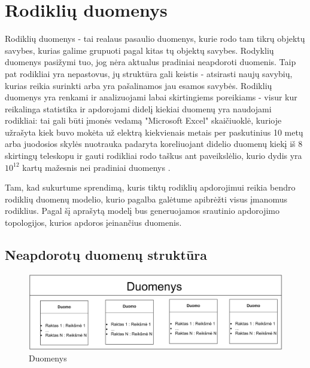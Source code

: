 \documentclass{VUMIFPSbakalaurinis}
\begin{document}
\section{Rodiklių duomenys}

Rodiklių duomenys - tai realaus pasaulio duomenys, kurie rodo tam tikrų objektų savybes, kurias galime grupuoti pagal kitas tų objektų savybes. Rodyklių duomenys pasižymi tuo, jog nėra aktualus pradiniai neapdoroti duomenis. Taip pat rodikliai yra nepastovus, jų struktūra gali keistis - atsirasti naujų savybių, kurias reikia surinkti arba yra pašalinamos jau esamos savybės. Rodiklių duomenys yra renkami ir analizuojami labai skirtingiems poreikiams - visur kur reikalinga statistika ir apdorojami didelį kiekiai duomenų yra naudojami rodikliai: tai gali būti įmonės vedamą "Microsoft Excel" skaičiuoklė, kurioje užrašyta kiek buvo mokėta už elektrą kiekvienais metais per paskutinius 10 metų arba juodosios skylės nuotrauka padaryta koreliuojant didelio duomenų kiekį iš 8 skirtingų teleskopu ir gauti rodikliai rodo taškus ant paveikslėlio, kurio dydis yra \(10^{12}\) kartų mažesnis nei pradiniai duomenys \cite{akiyama2019first}. \par    
Tam, kad sukurtume sprendimą, kuris tiktų rodiklių apdorojimui reikia bendro rodiklių duomenų modelio, kurio pagalba galėtume apibrėžti visus įmanomus rodiklius. Pagal šį aprašytą modelį bus generuojamos srautinio apdorojimo topologijos, kurios apdoros įeinančius duomenis.

\subsection{Neapdorotų duomenų struktūra}

\begin{figure}[H]
    \centering
    \includegraphics[width=1\textwidth]{img/duomenys.png}
    \caption{Duomenys}
    \label{img:duomenys}
\end{figure}
\end{document}

